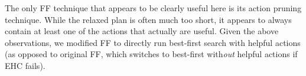 
The only FF technique that appears to be clearly useful here is its
action pruning technique. While the relaxed plan is often much too
short, it appears to always contain at least one of the actions that
actually are useful.
%
%
%
%
%
Given the above observations, we modified FF to directly run
best-first search with helpful actions (as
opposed to original FF, which switches to best-first with{\em out}
helpful actions if EHC fails).










